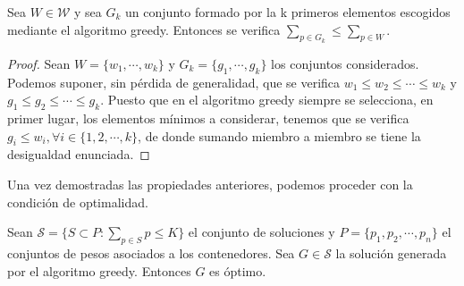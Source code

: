 


\begin{lemma}
    Sea $W \in \mathcal W$ y sea $G_k$ un conjunto formado
    por la k primeros elementos escogidos mediante el algoritmo greedy. 
    Entonces se verifica $\sum_{p \in G_k} \leq \sum_{p \in W}$. 
\end{lemma}

\begin{proof}
    Sean $W = \{w_1,\cdots, w_k\}$ y $G_k = \{g_1,\cdots,g_k\}$ los conjuntos considerados.
    Podemos suponer, sin pérdida de generalidad, que se verifica
    $w_1 \leq w_2 \leq \cdots \leq w_k$ y $g_1 \leq g_2 \leq \cdots \leq g_k$. 
    Puesto que en el algoritmo greedy siempre se selecciona, en primer lugar, los elementos
    mínimos a considerar, tenemos que se verifica $g_i \leq w_i, \forall i \in \{1,2,\cdots,k\}$,
    de donde sumando miembro a miembro se tiene la desigualdad enunciada.

\end{proof}

Una vez demostradas las propiedades anteriores, podemos proceder con la condición
de optimalidad.

\begin{theorem}
    Sean $\mathcal{S} = \{S \subset P : \sum_{p \in S} p \leq K\}$ el conjunto de soluciones y
    $P = \{p_1,p_2,\cdots,p_n\}$ el conjuntos de pesos asociados
a los contenedores. 
    Sea $G \in \mathcal S$ la solución generada por el algoritmo greedy. Entonces
    $G$ es óptimo. 
\end{theorem}

